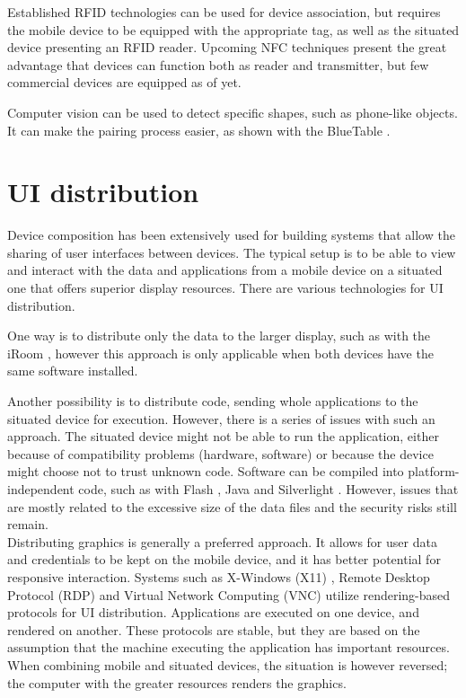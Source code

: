 Established RFID technologies can be used for device association, but requires the mobile device to be equipped with the appropriate tag, as well as the situated device presenting an RFID reader.
Upcoming NFC techniques present the great advantage that devices can function both as reader and transmitter, but few commercial devices are equipped as of yet.

Computer vision can be used to detect specific shapes, such as phone-like objects.
It can make the pairing process easier, as shown with the BlueTable \citep{Wilson:2007:bluetable}.

\section{UI distribution}
\label{sec:rwdistribution}

Device composition has been extensively used for building systems that allow the sharing of user interfaces between devices.
The typical setup is to be able to view and interact with the data and applications from a mobile device on a situated one that offers superior display resources.
There are various technologies for UI distribution.

One way is to distribute only the data to the larger display, such as with the iRoom \citep{Johanson:2002:iroom}, however this approach is only applicable when both devices have the same software installed.

Another possibility is to distribute code, sending whole applications to the situated device for execution.
However, there is a series of issues with such an approach.
The situated device might not be able to run the application, either because of compatibility problems (hardware, software) or because the device might choose not to trust unknown code.
Software can be compiled into platform-independent code, such as with Flash \citep{flash}, Java \citep{java} and Silverlight \citep{silverlight}.
However, issues that are mostly related to the excessive size of the data files and the security risks still remain.
\\
\linebreak
Distributing graphics is generally a preferred approach.
It allows for user data and credentials to be kept on the mobile device, and it has better potential for responsive interaction.
Systems such as X-Windows (X11) \citep{Scheifler:1986:x11}, Remote Desktop Protocol (RDP) \citep{Tritsch:2003:rdp} and Virtual Network Computing (VNC) \citep{Richardson:1998:vnc} utilize rendering-based protocols for UI distribution.
Applications are executed on one device, and rendered on another.
These protocols are stable, but they are based on the assumption that the machine executing the application has important resources.
When combining mobile and situated devices, the situation is however reversed; the computer with the greater resources renders the graphics.


